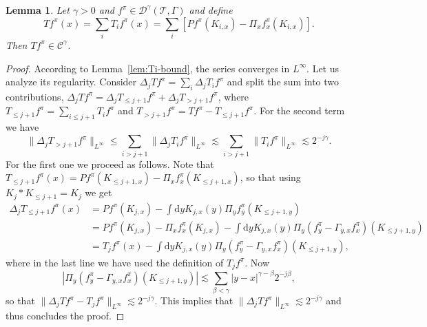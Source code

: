 \documentclass[11pt,a4paper]{article}
\newcommand{\mathd}{\mathrm{d}}
\newtheorem{lemma}[theorem]{Lemma}
\theoremstyle{remark}
\newcommand{\CC}{\ensuremath{\mathscr{C}}}
\begin{document}
\begin{lemma}\label{lem:T-hoelder}
  Let $\gamma >0$ and $f^\pi \in \mathcal{D}^{\gamma} ( \mathcal{T}, \Gamma )$ and define
  \[
     T f^{\pi} ( x ) = \sum_{i} T_{i} f^{\pi} ( x ) = \sum_{i} [P f^{\pi} ( K_{i,x} ) -  \Pi_{x} f^{\pi}_{x} ( K_{i,x} )].
  \]
  Then $T f^{\pi} \in \CC^{\gamma}$.
\end{lemma}

\begin{proof}
  According to Lemma~\ref{lem:Ti-bound}, the series converges in $L^\infty$. Let us analyze its regularity. Consider $\Delta_{j} T f^{\pi} =
  \sum_{i} \Delta_{j} T_{i} f^{\pi}$ and split the sum into two contributions,
  $\Delta_{j} T f^{\pi} = \Delta_{j} T_{\leqslant j+1}  f^{\pi} + \Delta_{j}
  T_{>j+1}  f^{\pi}$, where $T_{\leqslant j+1}  f^{\pi} = \sum_{i \leqslant
  j+1} T_{i}  f^{\pi}$ and $T_{>j+1}  f^{\pi} =T f^{\pi}  -T_{\leqslant j+1}
  f^{\pi}$. For the second term we have
  \[ \| \Delta_{j} T_{>j+1}  f^{\pi} \|_{L^{\infty}} \leqslant \sum_{i>j+1} \|
     \Delta_{j} T_{i} f^{\pi} \|_{L^{\infty}} \lesssim \sum_{i>j+1} \| T_{i}
     f^{\pi} \|_{L^{\infty}} \lesssim 2^{-j \gamma} . \]
  For the first one we proceed as follows. Note that $T_{\leqslant j+1}
  f^{\pi} ( x ) = P f^{\pi} (K_{\leqslant j+1,x} ) - \Pi_{x} f^{\pi}_{x} ( K_{\leqslant j+1,x} )$, so that using $K_{j} \ast K_{\leqslant
  j+1} =K_{j}$ we get
  \begin{align*}
     \Delta_{j} T_{\leqslant j+1}  f^{\pi}(x) & = P f^{\pi} ( K_{j,x} ) - \int \mathd y K_{j,x} ( y ) \Pi_{y} f^{\pi}_{y} ( K_{\leqslant j+1,y} ) \\
     & = P f^{\pi} ( K_{j,x} )  - \Pi_{x} f^{\pi}_{x} ( K_{j,x} ) - \int \mathd y K_{j,x} ( y ) \Pi_{y} ( f^{\pi}_{y} - \Gamma_{y,x} f^{\pi}_{x} ) ( K_{\leqslant j+1,y} ) \\
     & =T_{j} f^{\pi} ( x ) - \int \mathd y K_{j,x} ( y ) \Pi_{y} ( f^{\pi}_{y} - \Gamma_{y,x} f^{\pi}_{x} ) ( K_{\leqslant j+1,y} ),
  \end{align*}
  where in the last line we have used the definition of $T_{j} f^{\pi}$. Now
  \[
     | \Pi_{y} ( f^{\pi}_{y} - \Gamma_{y,x} f^{\pi}_{x} ) ( K_{\leqslant j+1,y} ) | \lesssim \sum_{\beta < \gamma} | y-x |^{\gamma - \beta} 2^{-j \beta},
  \]
  so that $\| \Delta_{j} T f^{\pi} -T_{j} f^{\pi} \|_{L^{\infty}} \lesssim 2^{-j
  \gamma}$. This implies that $\| \Delta_{j} T f^{\pi} \|_{L^{\infty}}
  \lesssim 2^{-j \gamma}$ and thus concludes the proof.
\end{proof}
\end{document}
